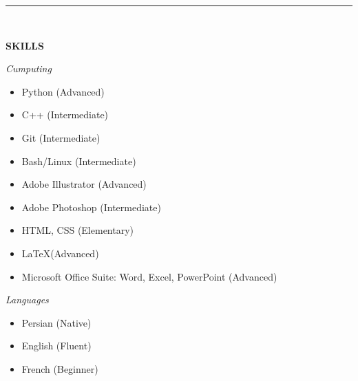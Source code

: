 \documentclass[11pt, b4paper]{cv}
\begin{document}
\vspace{-0.15in}
\rule{\textwidth}{1pt}\\
\vspace{-0.15in}

\textbf{SKILLS}


\textit{Cumputing}
\vspace{-0.1in}

\begin{multicols}{3}[]
	\begin{itemize}
	\setlength\itemsep{-0.5pt}
	  \item  Python (Advanced)
	  \item  C++ (Intermediate)
	  \item  Git (Intermediate)
	  \item  Bash/Linux (Intermediate)
	  \item  Adobe Illustrator (Advanced)
	  \item  Adobe Photoshop (Intermediate)
	  \item  HTML, CSS (Elementary)
	  \item  \LaTeX  (Advanced)
	  \item  Microsoft Office Suite: Word, Excel, PowerPoint (Advanced)
	\end{itemize}
\end{multicols}

\vspace{-0.1in}
\textit{Languages}
\vspace{-0.1in}

\begin{multicols}{3}[]
	\begin{itemize}
	\setlength\itemsep{-1pt}
	  \item  Persian (Native)
	  \item  English (Fluent)
	  \item  French (Beginner)
	\end{itemize}
\end{multicols}
\end{document}
